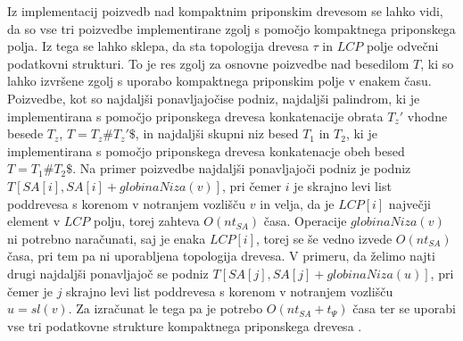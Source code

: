 Iz implementacij poizvedb nad kompaktnim priponskim drevesom se lahko vidi, da so vse tri poizvedbe implementirane zgolj s pomočjo kompaktnega priponskega polja. Iz tega se lahko sklepa, da sta topologija drevesa $\tau$ in $LCP$ polje odvečni podatkovni strukturi. To je res zgolj za osnovne poizvedbe nad besedilom $T$, ki so lahko izvršene zgolj s uporabo kompaktnega priponskim polje v enakem času. Poizvedbe, kot so najdaljši ponavljajočise podniz, najdaljši palindrom, ki je implementirana s pomočjo priponskega drevesa konkatenacije obrata $T_z'$ vhodne besede $T_z$, $T=T_{z}\#T_{z}'\$$, in najdaljši skupni niz besed $T_1$ in $T_2$, ki je implementirana s pomočjo priponskega drevesa konkatenacje obeh besed $T=T_1 \# T_2\$ $. Na primer poizvedbe najdaljši ponavljajoči podniz je podniz $T[SA[i],SA[i]+globinaNiza(v)]$, pri čemer $i$ je skrajno levi list poddrevesa s korenom v notranjem vozlišču $v$ in velja, da je $LCP[i]$ največji element v $LCP$ polju, torej zahteva $O(nt_{SA})$ časa. Operacije $globinaNiza(v)$ ni potrebno naračunati, saj je enaka $LCP[i]$, torej se še vedno izvede $O(nt_{SA})$ časa, pri tem pa ni uporabljena topologija drevesa. V primeru, da želimo najti drugi najdaljši ponavljajoč se podniz $T[SA[j],SA[j]+globinaNiza(u)]$, pri čemer je $j$ skrajno levi list poddrevesa s korenom v notranjem vozlišču $u=sl(v)$. Za izračunat le tega pa je potrebo $O(nt_{SA}+t_\Psi)$ časa ter se uporabi vse tri podatkovne strukture kompaktnega priponskega drevesa \cite{Valimaki2007, Weiner1973, Navarro2016}.